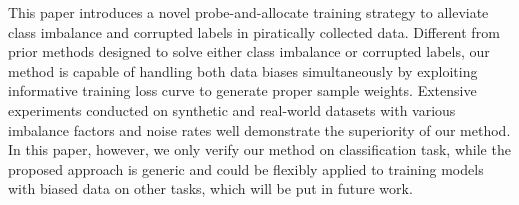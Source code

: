 \documentclass[letterpaper]{article} %
\begin{document}
This paper introduces a novel probe-and-allocate training strategy to alleviate class imbalance and corrupted labels in piratically collected data.
Different from prior methods designed to solve either class imbalance or corrupted labels, our method is capable of handling both data biases simultaneously by exploiting informative training loss curve to generate proper sample weights.
Extensive experiments conducted on synthetic and real-world datasets with various imbalance factors and noise rates well demonstrate the superiority of our method.
In this paper, however, we only verify our method on classification task, while the proposed approach is generic and could be flexibly applied to training models with biased data on other tasks, which  will be put in future work.

\vspace{-3.41mm}
\end{document}

